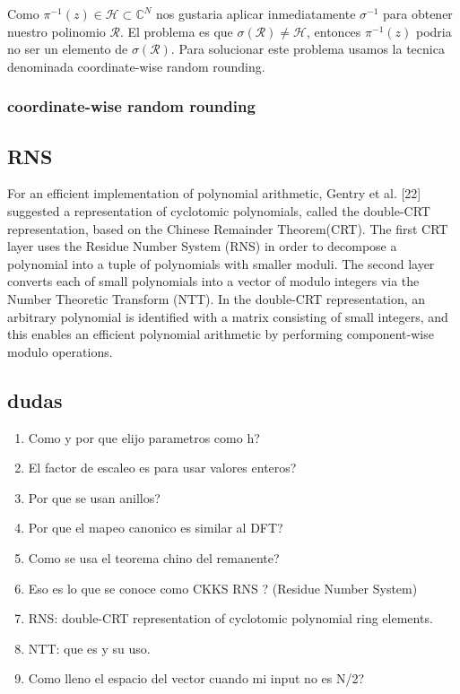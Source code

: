 \documentclass[12pt, oneside]{article}
\newcommand{\Hc}{\mathcal{H}}
\newcommand{\Rc}{\mathcal{R}}
\newcommand{\C}{\mathbb{C}}
\begin{document}
Como $\pi^{-1}(z)\in\Hc\subset\C^N$ nos gustaria aplicar inmediatamente $\sigma^{-1}$ para obtener nuestro
polinomio $\Rc$.
El problema es que $\sigma(\Rc)\neq\Hc$, entonces $\pi^{-1}(z)$ podria no ser un elemento de
$\sigma(\Rc)$.
Para solucionar este problema usamos la tecnica denominada coordinate-wise random rounding.
\subsubsection*{coordinate-wise random rounding}

\subsection{RNS}
For an efficient implementation of polynomial arithmetic, Gentry et al. [22]
suggested a representation of cyclotomic polynomials, called the double-CRT representation,
based on the Chinese Remainder Theorem(CRT).
The first CRT layer uses the Residue Number System (RNS) in order to decompose a
polynomial into a tuple of polynomials with smaller moduli.
The second layer converts each of small polynomials into a vector of modulo integers
via the Number Theoretic Transform (NTT).
In the double-CRT representation, an arbitrary polynomial is identified with a
matrix consisting of small integers, and this enables an efficient polynomial arithmetic
by performing component-wise modulo operations.
\subsection{dudas}
\begin{enumerate}
  \item Como y por que elijo parametros como h?
  \item El factor de escaleo es para usar valores enteros?
  \item Por que se usan anillos?
  \item Por que el mapeo canonico es similar al DFT?
  \item Como se usa el teorema chino del remanente?
  \item Eso es lo que se conoce como CKKS RNS ? (Residue Number System)
  \item RNS: double-CRT representation of cyclotomic polynomial ring elements.
  \item NTT: que es y su uso.
  \item Como lleno el espacio del vector cuando mi input no es N/2?
\end{enumerate}
\end{document}
